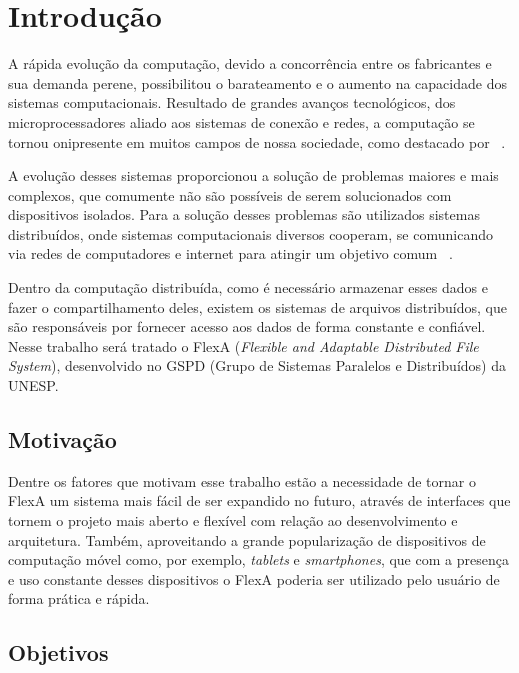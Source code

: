 
\chapter{Introdução}
\label{cap1}

    A rápida evolução da computação, devido a concorrência entre os fabricantes e sua demanda perene, possibilitou o barateamento e o aumento na capacidade dos sistemas computacionais. Resultado de grandes avanços tecnológicos, dos microprocessadores aliado aos sistemas de conexão e redes, a computação se tornou onipresente em muitos campos de nossa sociedade, como destacado por ~\cite{tanenbaum}.

    A evolução desses sistemas proporcionou a solução de problemas maiores e mais complexos, que comumente não são possíveis de serem solucionados com dispositivos isolados. Para a solução desses problemas são utilizados sistemas distribuídos, onde sistemas computacionais diversos cooperam, se comunicando via redes de computadores e internet para atingir um objetivo comum ~\cite{coulouris}.

    Dentro da computação distribuída, como é necessário armazenar esses dados e fazer o compartilhamento deles, existem os sistemas de arquivos distribuídos, que são responsáveis por fornecer acesso aos dados de forma constante e confiável. Nesse trabalho será tratado o FlexA (\textit{Flexible and Adaptable Distributed File System}), desenvolvido no GSPD (Grupo de Sistemas Paralelos e Distribuídos) da UNESP.


\section{Motivação}

    Dentre os fatores que motivam esse trabalho estão a necessidade de tornar o FlexA um sistema mais fácil de ser expandido no futuro, através de  interfaces que tornem o projeto mais aberto e flexível com relação ao desenvolvimento e arquitetura. Também, aproveitando a grande popularização de dispositivos de computação móvel como, por exemplo, \textit{tablets} e \textit{smartphones}, que com a presença e uso constante desses dispositivos o FlexA poderia ser utilizado pelo usuário de forma prática e rápida.

\section{Objetivos}


